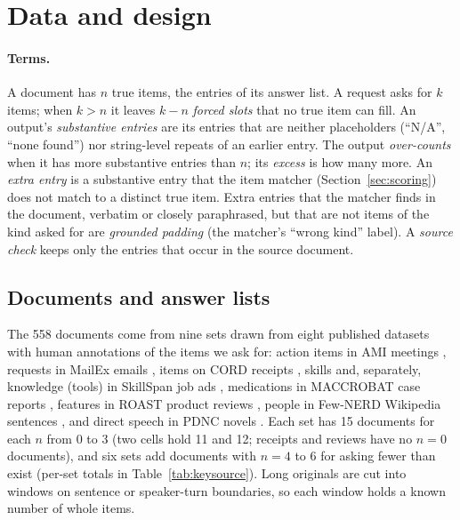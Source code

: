 \section{Data and design}
\label{sec:setup}

\paragraph{Terms.}
A document has $n$ true items, the entries of its answer list.
A request asks for $k$ items; when $k > n$ it leaves $k - n$ \emph{forced slots} that no true item can fill.
An output's \emph{substantive entries} are its entries that are neither placeholders (``N/A'', ``none found'') nor string-level repeats of an earlier entry.
The output \emph{over-counts} when it has more substantive entries than $n$; its \emph{excess} is how many more.
An \emph{extra entry} is a substantive entry that the item matcher (Section~\ref{sec:scoring}) does not match to a distinct true item.
Extra entries that the matcher finds in the document, verbatim or closely paraphrased, but that are not items of the kind asked for are \emph{grounded padding} (the matcher's ``wrong kind'' label).
A \emph{source check} keeps only the entries that occur in the source document.

\subsection{Documents and answer lists}
\label{sec:data}

The 558 documents come from nine sets drawn from eight published datasets with human annotations of the items we ask for: action items in AMI meetings \citep{carletta2005ami}, requests in MailEx emails \citep{srivastava2023mailex}, items on CORD receipts \citep{park2019cord}, skills and, separately, knowledge (tools) in SkillSpan job ads \citep{zhang2022skillspan}, medications in MACCROBAT case reports \citep{caufield2019maccrobat}, features in ROAST product reviews \citep{roast}, people in Few-NERD Wikipedia sentences \citep{ding2021fewnerd}, and direct speech in PDNC novels \citep{vishnubhotla2022pdnc}.
Each set has 15 documents for each $n$ from 0 to 3 (two cells hold 11 and 12; receipts and reviews have no $n = 0$ documents), and six sets add documents with $n = 4$ to 6 for asking fewer than exist (per-set totals in Table~\ref{tab:keysource}).
Long originals are cut into windows on sentence or speaker-turn boundaries, so each window holds a known number of whole items.

